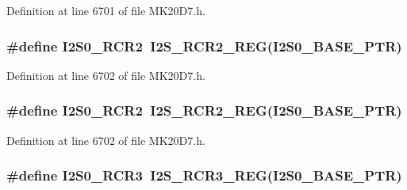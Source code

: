 Definition at line 6701 of file M\+K20\+D7.\+h.

\subsubsection[{\texorpdfstring{I2\+S0\+\_\+\+R\+C\+R2}{I2S0_RCR2}}]{\setlength{\rightskip}{0pt plus 5cm}\#define I2\+S0\+\_\+\+R\+C\+R2~{\bf I2\+S\+\_\+\+R\+C\+R2\+\_\+\+R\+EG}({\bf I2\+S0\+\_\+\+B\+A\+S\+E\+\_\+\+P\+TR})}\hypertarget{group___i2_s___register___accessor___macros_gab7a16c9f5fd4c40738f333de2ab3de84}{}\label{group___i2_s___register___accessor___macros_gab7a16c9f5fd4c40738f333de2ab3de84}


Definition at line 6702 of file M\+K20\+D7.\+h.

\subsubsection[{\texorpdfstring{I2\+S0\+\_\+\+R\+C\+R2}{I2S0_RCR2}}]{\setlength{\rightskip}{0pt plus 5cm}\#define I2\+S0\+\_\+\+R\+C\+R2~{\bf I2\+S\+\_\+\+R\+C\+R2\+\_\+\+R\+EG}({\bf I2\+S0\+\_\+\+B\+A\+S\+E\+\_\+\+P\+TR})}\hypertarget{group___i2_s___register___accessor___macros_gab7a16c9f5fd4c40738f333de2ab3de84}{}\label{group___i2_s___register___accessor___macros_gab7a16c9f5fd4c40738f333de2ab3de84}


Definition at line 6702 of file M\+K20\+D7.\+h.

\subsubsection[{\texorpdfstring{I2\+S0\+\_\+\+R\+C\+R3}{I2S0_RCR3}}]{\setlength{\rightskip}{0pt plus 5cm}\#define I2\+S0\+\_\+\+R\+C\+R3~{\bf I2\+S\+\_\+\+R\+C\+R3\+\_\+\+R\+EG}({\bf I2\+S0\+\_\+\+B\+A\+S\+E\+\_\+\+P\+TR})}\hypertarget{group___i2_s___register___accessor___macros_gad68233bf05ad7d786ba95d1cf965ee45}{}\label{group___i2_s___register___accessor___macros_gad68233bf05ad7d786ba95d1cf965ee45}


